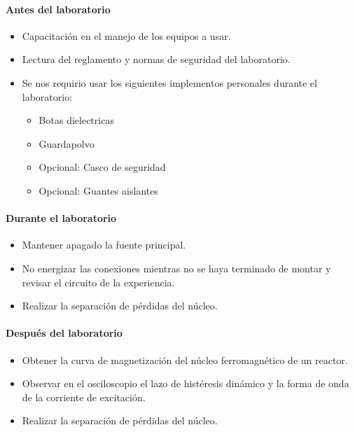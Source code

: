 \documentclass[12pt]{article}
\begin{document}
\paragraph{Antes del laboratorio}
\begin{itemize}
	\item {Capacitación en el manejo de los equipos a usar.}
	\item {Lectura del reglamento y normas de seguridad del laboratorio.}
	\item {Se nos requirio usar los siguientes implementos personales durante el laboratorio:}
	      \begin{itemize}
		      \item{Botas dielectricas}
		      \item{Guardapolvo}
		      \item{Opcional: Casco de seguridad}
		      \item{Opcional: Guantes aislantes}
	      \end{itemize}
\end{itemize}

\paragraph{Durante el laboratorio}
\begin{itemize}
	\item Mantener apagado la fuente principal.
	\item No energizar las conexiones mientras no se haya terminado de montar y revisar el circuito de la experiencia.
	\item Realizar la separación de pérdidas del núcleo.
\end{itemize}

\paragraph{Después del laboratorio}
\begin{itemize}
	\item Obtener la curva de magnetización del núcleo ferromagnético de un reactor.
	\item Observar en el osciloscopio el lazo de histéresis dinámico y la forma de onda de la corriente de excitación.
	\item Realizar la separación de pérdidas del núcleo.
\end{itemize}






\end{document}
